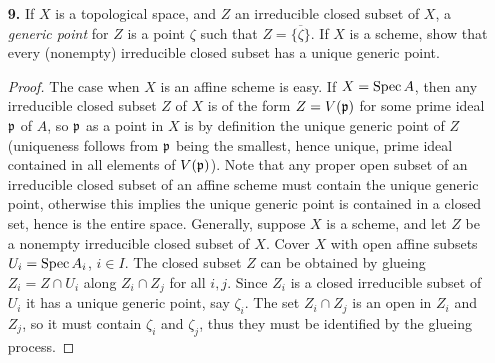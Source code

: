 \documentclass[a4paper]{article}
\begin{document}
\begin{enumerate} [label=\textbf{\arabic*.}, leftmargin=0em]
\begin{proof}
    We first identify the prime ideals of $k[\varepsilon] / (\varepsilon^2)$ and determine the topology of $\spec{k[\varepsilon] / (\varepsilon^2)}$. The only prime ideal is $(\varepsilon)$, in particular it is a local ring with nilpotent elements, so $\spec{k[\varepsilon] / (\varepsilon^2)}$ has only one point. We have the canonical projection $k[\varepsilon] / (\varepsilon^2) \to k$, which given a morphism of schemes $d : \spec{k[\varepsilon] / (\varepsilon^2)} \to X$ induces
    \begin{equation*}
        \spec{k} \to \spec{k[\varepsilon] / (\varepsilon^2)} \to X.
    \end{equation*}
    By Exercise 7, this is equivalent to giving a point $x \in X$ and an inclusion of fields $k(x) \hookrightarrow k$. Also, any $d$ induces a morphism between tangent spaces $$d^* : T_{(\varepsilon)}(\spec{k[\varepsilon]/(\varepsilon^2)}) \to T_x(X),$$
    and since $T_{(\varepsilon)}(\spec{k[\varepsilon]/(\varepsilon^2)})$ is a one-dimensional $k$-vector space, a linear map such as $d^*$ is equivalent to giving an element of $T_x(X)$.
\end{proof}

\item[\textbf{9.}] If $X$ is a topological space, and $Z$ an irreducible closed subset of $X$, a \textit{generic point} for $Z$ is a point $\zeta$ such that $Z = \overline{\{ \zeta \} }$. If $X$ is a scheme, show that every (nonempty) irreducible closed subset has a unique generic point.

\begin{proof}
   The case when $X$ is an affine scheme is easy. If $X = \operatorname{Spec}{A}$, then any irreducible closed subset $Z$ of $X$ is of the form $Z = V(\mathfrak{p})$ for some prime ideal $\mathfrak{p}$ of $A$, so $\mathfrak{p}$ as a point in $X$ is by definition the unique generic point of $Z$ (uniqueness follows from $\mathfrak{p}$ being the smallest, hence unique, prime ideal contained in all elements of $V(\mathfrak{p})$). Note that any proper open subset of an irreducible closed subset of an affine scheme must contain the unique generic point, otherwise this implies the unique generic point is contained in a closed set, hence is the entire space. Generally, suppose $X$ is a scheme, and let $Z$ be a nonempty irreducible closed subset of $X$. Cover $X$ with open affine subsets $U_i = \operatorname{Spec}{A_i}$, $i \in I$. The closed subset $Z$ can be obtained by glueing $Z_i = Z \cap U_i$ along $Z_i \cap Z_j$ for all $i, j$. Since $Z_i$ is a closed irreducible subset of $U_i$ it has a unique generic point, say $\zeta_i$. The set $Z_i \cap Z_j$ is an open in $Z_i$ and $Z_j$, so it must contain $\zeta_i$ and $\zeta_j$, thus they must be identified by the glueing process.
\end{proof}


\end{enumerate}
\end{document}
